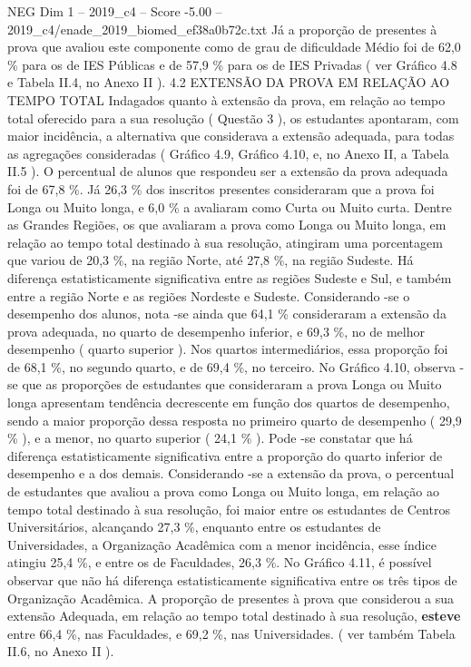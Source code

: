 \begin{textsample}{NEG Dim 1 – 2019\_c4 – Score -5.00 – 2019\_c4/enade\_2019\_biomed\_ef38a0b72c.txt}
Já a proporção de presentes à prova que avaliou este componente como de grau de dificuldade Médio foi de 62,0 \% para os de IES Públicas e de 57,9 \% para os de IES Privadas ( ver Gráfico 4.8 e Tabela II.4, no Anexo II ). 4.2 EXTENSÃO DA PROVA EM RELAÇÃO AO TEMPO TOTAL Indagados quanto à extensão da prova, em relação ao tempo total oferecido para a sua resolução ( Questão 3 ), os estudantes apontaram, com maior incidência, a alternativa que considerava a extensão adequada, para todas as agregações consideradas ( Gráfico 4.9, Gráfico 4.10, e, no Anexo II, a Tabela II.5 ).
O percentual de alunos que respondeu ser a extensão da prova adequada foi de 67,8 \%.
Já 26,3 \% dos inscritos presentes consideraram que a prova foi Longa ou Muito longa, e 6,0 \% a avaliaram como Curta ou Muito curta.
Dentre as Grandes Regiões, os que avaliaram a prova como Longa ou Muito longa, em relação ao tempo total destinado à sua resolução, atingiram uma porcentagem que variou de 20,3 \%, na região Norte, até 27,8 \%, na região Sudeste.
Há diferença estatisticamente significativa entre as regiões Sudeste e Sul, e também entre a região Norte e as regiões Nordeste e Sudeste.
Considerando -se o desempenho dos alunos, nota -se ainda que 64,1 \% consideraram a extensão da prova adequada, no quarto de desempenho inferior, e 69,3 \%, no de melhor desempenho ( quarto superior ).
Nos quartos intermediários, essa proporção foi de 68,1 \%, no segundo quarto, e de 69,4 \%, no terceiro.
No Gráfico 4.10, observa -se que as proporções de estudantes que consideraram a prova Longa ou Muito longa apresentam tendência decrescente em função dos quartos de desempenho, sendo a maior proporção dessa resposta no primeiro quarto de desempenho ( 29,9 \% ), e a menor, no quarto superior ( 24,1 \% ).
Pode -se constatar que há diferença estatisticamente significativa entre a proporção do quarto inferior de desempenho e a dos demais.
Considerando -se a extensão da prova, o percentual de estudantes que avaliou a prova como Longa ou Muito longa, em relação ao tempo total destinado à sua resolução, foi maior entre os estudantes de Centros Universitários, alcançando 27,3 \%, enquanto entre os estudantes de Universidades, a Organização Acadêmica com a menor incidência, esse índice atingiu 25,4 \%, e entre os de Faculdades, 26,3 \%.
No Gráfico 4.11, é possível observar que não há diferença estatisticamente significativa entre os três tipos de Organização Acadêmica.
A proporção de presentes à prova que considerou a sua extensão Adequada, em relação ao tempo total destinado à sua resolução, \textbf{esteve} entre 66,4 \%, nas Faculdades, e 69,2 \%, nas Universidades. ( ver também Tabela II.6, no Anexo II ).

\end{textsample}
